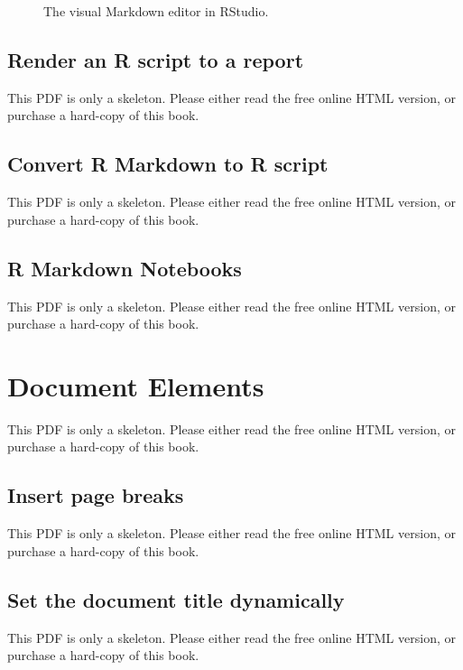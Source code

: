 \documentclass[
  11pt,
]{krantz}
\begin{document}
\begin{figure}\caption{The visual Markdown editor in RStudio.}\end{figure}

\section{Render an R script to a report}\label{spin}

This PDF is only a skeleton. Please either read the free online HTML version, or purchase a hard-copy of this book.

\section{Convert R Markdown to R script}\label{purl}

This PDF is only a skeleton. Please either read the free online HTML version, or purchase a hard-copy of this book.

\section{R Markdown Notebooks}\label{notebook}

This PDF is only a skeleton. Please either read the free online HTML version, or purchase a hard-copy of this book.

\chapter{Document Elements}\label{document-elements}

This PDF is only a skeleton. Please either read the free online HTML version, or purchase a hard-copy of this book.

\section{Insert page breaks}\label{pagebreaks}

This PDF is only a skeleton. Please either read the free online HTML version, or purchase a hard-copy of this book.

\section{Set the document title dynamically}\label{dynamic-yaml}

This PDF is only a skeleton. Please either read the free online HTML version, or purchase a hard-copy of this book.
\end{document}
